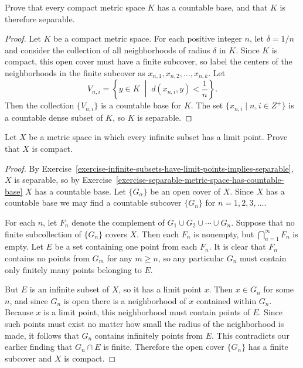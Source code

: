 Prove that every compact metric space $K$ has a
countable base, and that $K$ is therefore separable.
\begin{proof}
  Let $K$ be a compact metric space. For each positive integer $n$,
  let $\delta = 1/n$ and consider the collection of all neighborhoods
  of radius $\delta$ in $K$. Since $K$ is compact, this open cover
  must have a finite subcover, so label the centers of the
  neighborhoods in the finite subcover as
  $x_{n,1}, x_{n,2},\dots, x_{n,k}$. Let
  \begin{equation*}
    V_{n,i} = \left\{ y\in K \;\middle|\; d(x_{n,i},y) < \frac1n \right\}.
  \end{equation*}
  Then the collection $\{V_{n,i}\}$ is a countable base for $K$. The
  set $\{x_{n,i}\mid n,i\in Z^+\}$ is a countable dense subset of $K$,
  so $K$ is separable.
\end{proof}

 Let $X$ be a metric space in which every infinite subset
has a limit point. Prove that $X$ is compact.
\begin{proof}
  By
  Exercise~\ref{exercise-infinite-subsets-have-limit-points-implies-separable},
  $X$ is separable, so by
  Exercise~\ref{exercise-separable-metric-space-has-countable-base}
  $X$ has a countable base. Let $\{G_\alpha\}$ be an open cover of
  $X$. Since $X$ has a countable base we may find a countable subcover
  $\{G_n\}$ for $n = 1,2,3,\dots$.

  For each $n$, let $F_n$ denote the complement of
  $G_1\cup G_2\cup\cdots\cup G_n$. Suppose that no finite
  subcollection of $\{G_n\}$ covers $X$. Then each $F_n$ is nonempty,
  but $\bigcap_{n=1}^\infty F_n$ is empty. Let $E$ be a set containing
  one point from each $F_n$. It is clear that $F_n$ contains no points
  from $G_m$ for any $m\geq n$, so any particular $G_n$ must contain
  only finitely many points belonging to $E$.

  But $E$ is an infinite subset of $X$, so it has a limit point
  $x$. Then $x\in G_n$ for some $n$, and since $G_n$ is open there is
  a neighborhood of $x$ contained within $G_n$. Because $x$ is a limit
  point, this neighborhood must contain points of $E$. Since such
  points must exist no matter how small the radius of the neighborhood
  is made, it follows that $G_n$ contains infinitely points from
  $E$. This contradicts our earlier finding that $G_n\cap E$ is
  finite. Therefore the open cover $\{G_n\}$ has a finite subcover and
  $X$ is compact.
\end{proof}

